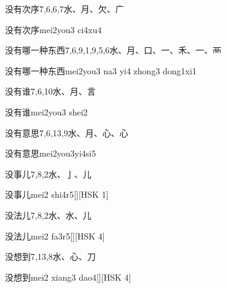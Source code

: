 \begin{Entry}{没有次序}{7,6,6,7}{⽔、⽉、⽋、⼴}
  \begin{Phonetics}{没有次序}{mei2you3 ci4xu4}
  \end{Phonetics}
\end{Entry}

\begin{Entry}{没有哪一种东西}{7,6,9,1,9,5,6}{⽔、⽉、⼝、⼀、⽲、⼀、⾑}
  \begin{Phonetics}{没有哪一种东西}{mei2you3 na3 yi4 zhong3 dong1xi1}
  \end{Phonetics}
\end{Entry}

\begin{Entry}{没有谁}{7,6,10}{⽔、⽉、⾔}
  \begin{Phonetics}{没有谁}{mei2you3 shei2}
  \end{Phonetics}
\end{Entry}

\begin{Entry}{没有意思}{7,6,13,9}{⽔、⽉、⼼、⼼}
  \begin{Phonetics}{没有意思}{mei2you3yi4si5}
  \end{Phonetics}
\end{Entry}

\begin{Entry}{没事儿}{7,8,2}{⽔、⼅、⼉}
  \begin{Phonetics}{没事儿}{mei2 shi4r5}[][HSK 1]
  \end{Phonetics}
\end{Entry}

\begin{Entry}{没法儿}{7,8,2}{⽔、⽔、⼉}
  \begin{Phonetics}{没法儿}{mei2 fa3r5}[][HSK 4]
  \end{Phonetics}
\end{Entry}

\begin{Entry}{没想到}{7,13,8}{⽔、⼼、⼑}
  \begin{Phonetics}{没想到}{mei2 xiang3 dao4}[][HSK 4]
  \end{Phonetics}
\end{Entry}

